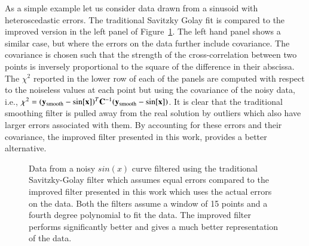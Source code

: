\documentclass[iop, apj, onecolumn]{emulateapj}
\begin{document}
As a simple example let us consider data drawn from a sinusoid with
heteroscedastic errors. The traditional Savitzky Golay fit is compared to the
improved version in the left panel of Figure~\ref{fig:improve}. The left hand
panel shows a similar case, but where the errors on the data further include
covariance. The covariance is chosen such that the strength of the
cross-correlation between two points is inversely proportional to the square of
the difference in their abscissa. The $\chi^2$ reported in the lower row of
each of the panels are computed with respect to the noiseless values at each
point but using the covariance of the noisy data, i.e., $\chi^2=({\bf y}_{\rm
smooth}-\sin[{\bf x}])^T {\bf C}^{-1} ({\bf y}_{\rm
smooth}-\sin[{\bf x}])$. It is clear that the traditional smoothing
filter is pulled away from the real solution by outliers which also have larger
errors associated with them. By accounting for these errors and their
covariance, the improved filter presented in this work, provides a better
alternative.

\begin{figure} 
\caption{
        Data from a noisy $sin(x)$ curve filtered using the traditional
        Savitzky-Golay filter which assumes equal errors compared to the
        improved filter presented in this work which uses the actual errors on
        the data. Both the filters assume a window of 15 points and a fourth
        degree polynomial to fit the data. The improved filter performs
        significantly better and gives a much better representation of the data.
}
\label{fig:improve}
\end{figure}





\end{document}
